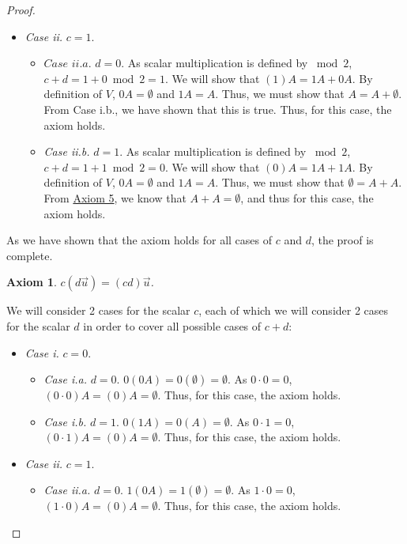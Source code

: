 \documentclass[11pt]{scrartcl}
\theoremstyle{dotlessP}
\newtheorem{axiom}{Axiom}
\theoremstyle{dotlessN}
\begin{document}
\begin{proof}
\begin{subproof}
\begin{itemize}
\begin{itemize}
						\end{itemize}
					\item \textit{Case ii.} $c = 1$.
						\begin{itemize}
							\item $\textit{Case ii.a.}$  $d = 0$. As scalar multiplication is defined by $\bmod 2$,  $c + d = 1 + 0 \bmod 2 = 1$. We will show that $(1)A = 1A + 0A$. By definition of $V$, $0A = \emptyset$ and $1A = A$. Thus, we must show that $A = A + \emptyset$. From Case i.b., we have shown that this is true. Thus, for this case, the axiom holds.
							\item \textit{Case ii.b.} $d = 1$. As scalar multiplication is defined by $\bmod 2$, $c + d = 1 + 1 \bmod 2 = 0$. We will show that $(0)A = 1A + 1A$. By definition of $V$, $0A = \emptyset$ and $1A = A$. Thus, we must show that $\emptyset = A + A$. From \hyperref[axiom:5]{Axiom 5}, we know that $A + A = \emptyset$, and thus for this case, the axiom holds.
						\end{itemize}
				\end{itemize}
				As we have shown that the axiom holds for all cases of $c$ and $d$, the proof is complete.
		\end{subproof}
		\begin{axiom}
			$c(d\vec{u}) = (cd)\vec{u}$.
		\end{axiom}
		\begin{subproof}
			[Subproof]
			We will consider 2 cases for the scalar $c$, each of which we will consider 2 cases for the scalar $d$ in order to cover all possible cases of $c + d$:
				\begin{itemize}
					\item \textit{Case i.} $c = 0$.
						\begin{itemize}
							\item \textit{Case i.a.} $d = 0$. $0(0A) = 0(\emptyset) = \emptyset$. As $0 \cdot 0 = 0$, $(0 \cdot 0)A = (0)A = \emptyset$. Thus, for this case, the axiom holds.
							\item \textit{Case i.b.} $d = 1$. $0(1A) = 0(A) = \emptyset$. As $0 \cdot 1 = 0$, $(0 \cdot 1)A = (0)A = \emptyset$. Thus, for this case, the axiom holds.
						\end{itemize}
					\item \textit{Case ii.} $c = 1$.
						\begin{itemize}
							\item \textit{Case ii.a.} $d = 0$. $1(0A) = 1(\emptyset) = \emptyset$. As $1 \cdot 0 = 0$, $(1 \cdot 0)A = (0)A = \emptyset$. Thus, for this case, the axiom holds.

\end{itemize}
\end{itemize}
\end{subproof}
\end{proof}
\end{document}
